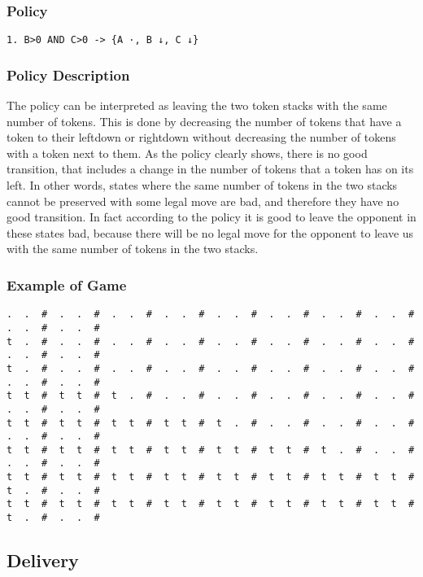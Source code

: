 \documentclass[a4paper]{article}
\begin{document}
\subsubsection{Policy}
\begin{Verbatim}[fontsize=\footnotesize]
  1. B>0 AND C>0 -> {A ·, B ↓, C ↓}
\end{Verbatim}

\subsubsection{Policy Description}
The policy can be interpreted as leaving the two token stacks with the same number of tokens. This is done by decreasing the number of tokens that have a token to their leftdown or rightdown without decreasing the number of tokens with a token next to them.
As the policy clearly shows, there is no good transition, that includes a change in the number of tokens that a token has on its left. In other words, states where the same number of tokens in the two stacks cannot be preserved with some legal move are bad, and therefore they have no good transition. In fact according to the policy it is good to leave the opponent in these states bad, because there will be no legal move for the opponent to leave us with the same number of tokens in the two stacks.


\subsubsection{Example of Game}
\begin{Verbatim}[fontsize=\footnotesize]
.  .  #  .  .  #  .  .  #  .  .  #  .  .  #  .  .  #  .  .  #  .  .  #  .  .  #  .  .  #
t  .  #  .  .  #  .  .  #  .  .  #  .  .  #  .  .  #  .  .  #  .  .  #  .  .  #  .  .  #
t  .  #  .  .  #  .  .  #  .  .  #  .  .  #  .  .  #  .  .  #  .  .  #  .  .  #  .  .  #
t  t  #  t  t  #  t  .  #  .  .  #  .  .  #  .  .  #  .  .  #  .  .  #  .  .  #  .  .  #
t  t  #  t  t  #  t  t  #  t  t  #  t  .  #  .  .  #  .  .  #  .  .  #  .  .  #  .  .  #
t  t  #  t  t  #  t  t  #  t  t  #  t  t  #  t  t  #  t  .  #  .  .  #  .  .  #  .  .  #
t  t  #  t  t  #  t  t  #  t  t  #  t  t  #  t  t  #  t  t  #  t  t  #  t  .  #  .  .  #
t  t  #  t  t  #  t  t  #  t  t  #  t  t  #  t  t  #  t  t  #  t  t  #  t  .  #  .  .  #
\end{Verbatim}

\subsection{Delivery}
\end{document}
